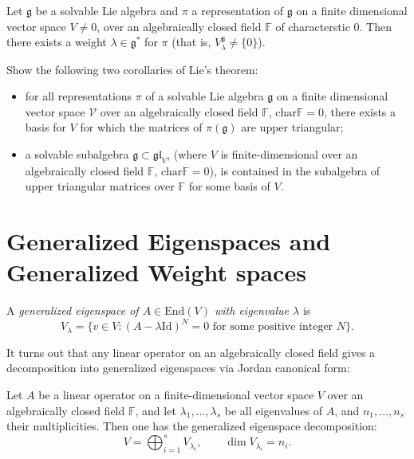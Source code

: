 \begin{theorem}
\label{theorem-Lie}
Let $\mathfrak{g}$ be a solvable Lie algebra and $\pi$ a representation of
$\mathfrak{g}$ on a finite dimensional vector space $V \neq 0$, over an
algebraically closed field $\mathbb{F}$ of characterstic 0. 
Then there exists a weight $\lambda \in \mathfrak{g}^*$ for $\pi$ 
(that is, $V_\lambda^\mathfrak{g} \neq \{0\}$).
\end{theorem}

\begin{exercise}
\label{exercise-corollaries-of-Lie-theorem}
Show the following two corollaries of Lie's theorem:
\begin{itemize}
\item for all representations $\pi$ of a solvable Lie algebra $\mathfrak{g}$ on
a finite dimensional vector space $\mathcal{V}$ over an algebraically closed
field $\mathbb{F}$, $\text{char}\mathbb{F}=0$, 
there exists a basis for $V$ for which the matrices
of $\pi(\mathfrak{g})$ are upper triangular;
\item a solvable subalgebra $\mathfrak{g} \subset \mathfrak{gl}_V$,
(where $V$ is finite-dimensional over an algebraically closed field
$\mathbb{F}$, $\text{char}\mathbb{F}=0$),
is contained in the subalgebra of upper triangular matrices
over $\mathbb{F}$ for some basis of $V$.
\end{itemize}
\end{exercise}

\section{Generalized Eigenspaces and Generalized Weight spaces}
\label{section-generalized-eigenspaces-and-generalized-weight-spaces}

\begin{definition}
\label{definition-generalized-eigenspace}
A {\it generalized eigenspace of $A \in \text{End}(V)$ 
with eigenvalue $\lambda$} is
$$
V_\lambda=\{v \in V:(A-\lambda \text{Id})^N=0
\text{ for some positive integer }N\}.
$$
\end{definition}

It turns out that any linear operator on an algebraically closed field gives a
decomposition into generalized eigenspaces via Jordan canonical form:

\begin{proposition}
\label{proposition-generalized-eigenspace-decomposition}
Let $A$ be a linear operator on a finite-dimensional
vector space $V$ over an algebraically closed
field $\mathbb{F}$, and let $\lambda_1,\ldots,\lambda_s$ 
be all eigenvalues of $A$, and $n_1,\ldots,n_s$ their 
multiplicities.
Then one has the generalized eigenspace decomposition:
$$
V=\bigoplus_{i=1}^s V_{\lambda_i},\qquad \dim V_{\lambda_i}=n_i.
$$
\end{proposition}

